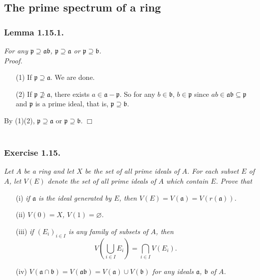 \documentclass{article}
\begin{document}



\subsection*{The prime spectrum of a ring \\}



\subsubsection*{Lemma 1.15.1.}
\emph{For any $\mathfrak{p} \supseteq \mathfrak{a} \mathfrak{b}$,
$\mathfrak{p} \supseteq \mathfrak{a}$ or $\mathfrak{p} \supseteq \mathfrak{b}$.} \\

\emph{Proof.}
\begin{enumerate}
\item[(1)] If $\mathfrak{p} \supseteq \mathfrak{a}$. We are done.
\item[(2)] If $\mathfrak{p} \not\supseteq \mathfrak{a}$,
there exists $a \in \mathfrak{a} - \mathfrak{p}$.
So for any $b \in \mathfrak{b}$, $b \in \mathfrak{p}$
since $ab \in \mathfrak{ab} \subseteq \mathfrak{p}$ and $\mathfrak{p}$ is a prime ideal,
that is, $\mathfrak{p} \supseteq \mathfrak{b}$.
\end{enumerate}
By (1)(2), $\mathfrak{p} \supseteq \mathfrak{a}$ or $\mathfrak{p} \supseteq \mathfrak{b}$.
$\Box$ \\\\



\subsubsection*{Exercise 1.15.}
\emph{Let $A$ be a ring and let $X$ be the set of all prime ideals of $A$.
For each subset $E$ of $A$,
let $V(E)$ denote the set of all prime ideals of $A$ which contain $E$.
Prove that}
\begin{enumerate}
\item[(i)]
  \emph{if $\mathfrak{a}$ is the ideal generated by $E$,
  then $V(E) = V(\mathfrak{a}) = V(r(\mathfrak{a}))$.}

\item[(ii)]
  \emph{$V(0) = X$, $V(1) = \varnothing$.}

\item[(iii)]
  \emph{if $(E_i)_{i \in I}$ is any family of subsets of $A$,
  then
  $$V\left( \bigcup_{i \in I}E_i \right) = \bigcap_{i \in I} V(E_i).$$}

\item[(iv)]
  \emph{$V(\mathfrak{a} \cap \mathfrak{b})
  = V(\mathfrak{a} \mathfrak{b})
  = V(\mathfrak{a}) \cup V(\mathfrak{b})$
  for any ideals $\mathfrak{a}$, $\mathfrak{b}$ of $A$.}
\end{enumerate}
\end{document}
